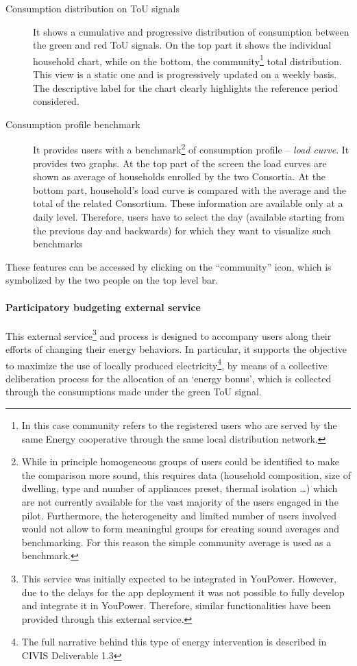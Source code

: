\begin{description}
 \item[Consumption distribution on ToU signals] It shows a cumulative and progressive distribution of consumption between the green and red ToU signals.
 On the top part it shows the individual household chart, while on the bottom, the community\footnote{In this case community refers to the registered users who 
 are served by the same Energy cooperative through the same local distribution network.} total distribution. This view is a static one and is progressively updated on a weekly basis. The descriptive label for the chart clearly highlights the reference period considered.
 \item[Consumption profile benchmark] It provides users with a benchmark\footnote{While in principle homogeneous groups of users could be identified to make the comparison more sound, this requires data (household composition, size of dwelling, type and number of appliances preset, thermal isolation \ldots) which are not currently available for the vast majority of the users engaged in the pilot.
 Furthermore, the heterogeneity and limited number of users involved would not allow to form meaningful groups for creating sound averages and benchmarking. For this reason the simple community average is used as a benchmark.} of consumption profile -- \textit{load curve}. It provides two graphs. At the top part of the screen the load curves are shown as average of households enrolled by the two Consortia.
 At the bottom part, household's load curve is compared with the average and the total of the related Consortium. These information are available only at a daily level. Therefore, users have to select the day (available starting from the previous day and backwards) for which they want to visualize such benchmarks
\end{description}
These features can be accessed by clicking on the ``community'' icon, which is symbolized by the two people on the top level bar.


\paragraph{Participatory budgeting external service} 

This external service\footnote{This service was initially expected to be integrated in YouPower. However, due to the delays for the app deployment it was not possible
to fully develop and integrate it in YouPower. Therefore, similar functionalities have been provided through
this external service.} and process is designed to accompany users along their efforts of changing their energy behaviors.
In particular, it supports the objective to maximize the use of locally produced electricity\footnote{The full narrative behind this type of energy intervention
is described in CIVIS Deliverable 1.3}, by means of a collective deliberation process for the allocation of an `energy bonus', which is collected through the consumptions
made under the green ToU signal.

